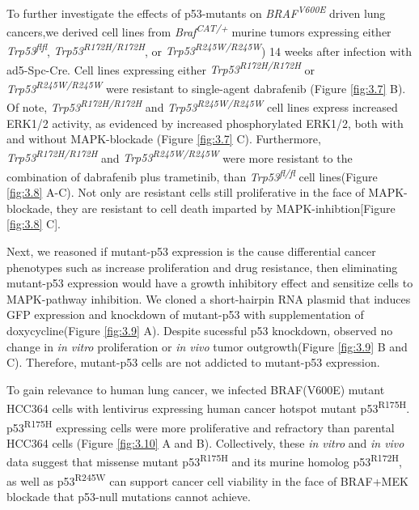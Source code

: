 To further investigate the effects of p53-mutants on \emph{BRAF\textsuperscript{V600E}} driven lung cancers,we derived cell lines from \emph{Braf\textsuperscript{CAT/+}} murine tumors expressing either \emph{Trp53\textsuperscript{flfl}}, \emph{Trp53\textsuperscript{R172H/R172H}}, or \emph{Trp53\textsuperscript{R245W/R245W}}) 14 weeks after infection with ad5-Spc-Cre. Cell lines expressing either \emph{Trp53\textsuperscript{R172H/R172H}} or \emph{Trp53\textsuperscript{R245W/R245W}} were resistant to single-agent dabrafenib (Figure \ref{fig:3.7} B). Of note, \emph{Trp53\textsuperscript{R172H/R172H}} and \emph{Trp53\textsuperscript{R245W/R245W}} cell lines express increased ERK1/2 activity, as evidenced by increased phosphorylated ERK1/2, both with and without MAPK-blockade (Figure \ref{fig:3.7} C). Furthermore, \emph{Trp53\textsuperscript{R172H/R172H}} and \emph{Trp53\textsuperscript{R245W/R245W}} were more resistant to the combination of dabrafenib plus trametinib, than \emph{Trp53\textsuperscript{fl/fl}} cell lines(Figure \ref{fig:3.8} A-C). Not only are resistant cells still proliferative in the face of MAPK-blockade, they are resistant to cell death imparted by MAPK-inhibtion{[}Figure \ref{fig:3.8} C{]}.

Next, we reasoned if mutant-p53 expression is the cause differential cancer phenotypes such as increase proliferation and drug resistance, then eliminating mutant-p53 expression would have a growth inhibitory effect and sensitize cells to MAPK-pathway inhibition. We cloned a short-hairpin RNA plasmid that induces GFP expression and knockdown of mutant-p53 with supplementation of doxycycline(Figure \ref{fig:3.9} A). Despite sucessful p53 knockdown, observed no change in \emph{in vitro} proliferation or \emph{in vivo} tumor outgrowth(Figure \ref{fig:3.9} B and C). Therefore, mutant-p53 cells are not addicted to mutant-p53 expression.

To gain relevance to human lung cancer, we infected BRAF(V600E) mutant HCC364 cells with lentivirus expressing human cancer hotspot mutant p53\textsuperscript{R175H}. p53\textsuperscript{R175H} expressing cells were more proliferative and refractory than parental HCC364 cells (Figure \ref{fig:3.10} A and B). Collectively, these \emph{in vitro} and \emph{in vivo} data suggest that missense mutant p53\textsuperscript{R175H} and its murine homolog p53\textsuperscript{R172H}, as well as p53\textsuperscript{R245W} can support cancer cell viability in the face of BRAF+MEK blockade that p53-null mutations cannot achieve.

